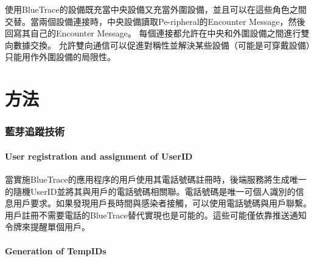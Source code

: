 \documentclass[12pt, a4paper]{report}
\begin{document}
使用BlueTrace的設備既充當中央設備又充當外圍設備，並且可以在這些角色之間交替。當兩個設備連接時，中央設備讀取Pe-ripheral的Encounter Message，然後回寫其自己的Encounter Message。 每個連接都允許在中央和外圍設備之間進行雙向數據交換。 允許雙向通信可以促進對稱性並解決某些設備（可能是可穿戴設備）只能用作外圍設備的局限性。

\part{方法}

\section{藍芽追蹤技術}

\subsection{User registration and assignment of UserID}

\begin{figure}[H] %
    \centering %
\end{figure}

當實施BlueTrace的應用程序的用戶使用其電話號碼註冊時，後端服務將生成唯一的隨機UserID並將其與用戶的電話號碼相關聯。電話號碼是唯一可個人識別的信息用戶要求。如果發現用戶長時間與感染者接觸，可以使用電話號碼與用戶聯繫。用戶註冊不需要電話的BlueTrace替代實現也是可能的。這些可能僅依靠推送通知令牌來提醒單個用戶。

\subsection{Generation of TempIDs}

\begin{figure}[H] %
    \centering %
\end{figure}
\end{document}
